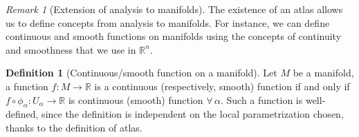 \documentclass[a4paper,11pt,titlepage, article, oneside]{memoir}
\numberwithin{equation}{section}
\theoremstyle{definition}
\newtheorem{definition}[theorem]{Definition}
\theoremstyle{remark}
\newtheorem{remark}[theorem]{Remark}
\newcommand{\rfield}{\mathbb{R}}
\begin{document}
\begin{remarkbox}\begin{remark}[Extension of analysis to manifolds]
  The existence of an atlas allows us to define concepts from analysis to manifolds. For instance, we can define continuous and smooth functions on manifolds using the concepts of continuity and smoothness that we use in $\rfield^n$.
\end{remark}\end{remarkbox}

\begin{definition}[Continuous/smooth function on a manifold]
  Let $M$ be a manifold, a function $f \colon M \rightarrow \rfield$ is a continuous (respectively, smooth) function if and only if $f \circ \phi_{\alpha} \colon U_{\alpha} \rightarrow \rfield$ is continuous (smooth) function $\forall \, \alpha$. Such a function is well-defined, since the definition is independent on the local parametrization chosen, thanks to the definition of atlas.
\end{definition}
\end{document}
